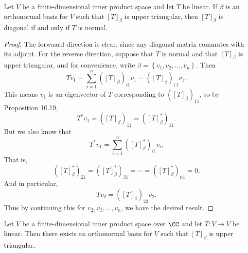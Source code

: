 \documentclass[linearalgebra]{subfiles}
\begin{document}
    \begin{prop}{}
        Let $V$ be a finite-dimensional inner product space and let $T$ be linear. If $\beta$ is an orthonormal basis for $V$ such that $\left[ T \right] _\beta$ is upper triangular, then $\left[ T \right] _\beta$ is diagonal if and only if $T$ is normal.
    \end{prop}

    \begin{proof}
        The forwaard direction is clear, since any diagonal matrix commutes with its adjoint. For the reverse direction, suppose that $T$ is normal and that $\left[ T \right] _\beta$ is upper triangular, and for convenience, write $\beta = \left\lbrace v_1,v_2,\ldots,v_n \right\rbrace$. Then
        \begin{equation*}
            Tv_1 = \sum^{n}_{i=1} \left( \left[ T \right] _\beta \right) _{i1}v_1= \left( \left[ T \right] _\beta \right) _{11}v_1.
        \end{equation*}
        This means $v_1$ is an eigenvector of $T$ corresponding to $\left( \left[ T \right] _\beta \right) _{11}$, so by Proposition 10.19,
        \begin{equation*}
            T^*v_1 = \left( \left[ T \right] _\beta \right) _{11} = \left( \left[ T \right] ^*_\beta \right) _{11}.
        \end{equation*}
        But we also know that
        \begin{equation*}
            T^*v_1 = \sum^{n}_{i=1} \left( \left[ T \right] _\beta^* \right) _{i1}v_i.
        \end{equation*}
        That is,
        \begin{equation*}
            \left( \left[ T \right] _\beta^* \right) _{21} = \left( \left[ T \right] _\beta^* \right) _{31} = \cdots = \left( \left[ T \right] _\beta^* \right) _{n1} = 0.
        \end{equation*}
        And in particular,
        \begin{equation*}
            Tv_2 = \left( \left[ T \right] _\beta \right) _{22}v_2.
        \end{equation*}
        Thus by continuing this for $v_2,v_3,\ldots,v_n$, we have the desired result.
    \end{proof}

    \begin{prop}{}
        Let $V$ be a finite-dimensional inner product space over $\CC$ and let $T:V\to V$ be linear. Then there exists an orthonormal basis for $V$ such that $\left[ T \right] _\beta$ is upper triangular.
    \end{prop}
\end{document}
